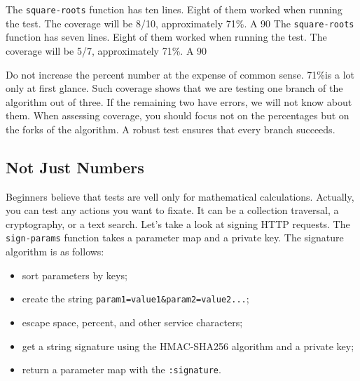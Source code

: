 \ifx\DEVICETYPE\MOBILE

\def\covperc{80\%}

\else

\def\covperc{71\%}

\fi

\ifx\DEVICETYPE\MOBILE
The \verb|square-roots| function has ten lines. Eight of them worked when running the test. The coverage will be 8/10, approximately \covperc. A 90%
\else
The \verb|square-roots| function has seven lines. Eight of them worked when running the test. The coverage will be 5/7, approximately \covperc. A 90%
\fi

Do not increase the percent number at the expense of common sense. \covperc is a lot only at first glance. Such coverage shows that we are testing one branch of the algorithm out of three. If the remaining two have errors, we will not know about them. When assessing coverage, you should focus not on the percentages but on the forks of the algorithm. A robust test ensures that every branch succeeds.

\subsection{Not Just Numbers}

Beginners believe that tests are vell only for mathematical calculations. Actually, you can test any actions you want to fixate. It can be a collection traversal, a cryptography, or a text search.
Let's take a look at signing HTTP requests. The \verb|sign-params| function takes a parameter map and a private key. The signature algorithm is as follows:

\begin{itemize}


\item
  sort parameters by keys;

\item
  create the string \texttt{param1=value1\&param2\-=va\-lue2...};

\item
  escape space, percent, and other service characters;

\item
  get a string signature using the HMAC-SHA256 algorithm and a private key;

\item
  return a parameter map with the \texttt{:sig\-na\-tu\-re}.

\end{itemize}

